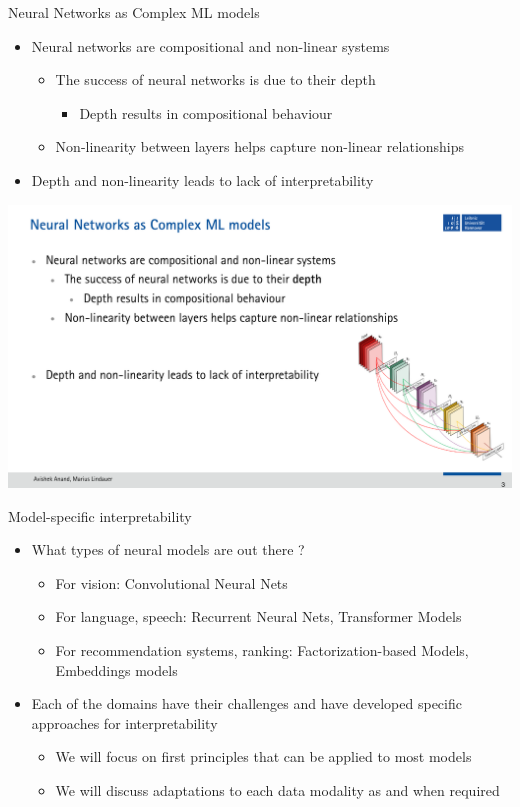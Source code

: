 \documentclass[11pt,compress,t,notes=noshow, aspectratio=169, xcolor=table]{beamer}
\begin{document}
\begin{frame}{Neural Networks as Complex ML models}
	\begin{itemize}
		\item Neural networks are compositional and non-linear systems
		\begin{itemize}
			\item The success of neural networks is due to their depth
			\begin{itemize}
				\item Depth results in compositional behaviour
			\end{itemize}
			\item Non-linearity between layers helps capture non-linear relationships
		\end{itemize}
		\bigskip
		
		\item Depth and non-linearity leads to lack of interpretability
	\end{itemize}

    \hfill
    \includegraphics[scale=.4]{img116}

\end{frame}

\begin{frame}[c]{Model-specific interpretability}
	\begin{itemize}
		\item What types of neural models are out there ?
		\begin{itemize}
			\item For vision: Convolutional Neural Nets
			\item For language, speech: Recurrent Neural Nets, Transformer Models
			\item For recommendation systems, ranking: Factorization-based Models, Embeddings
models
		\end{itemize}
		\item Each of the domains have their challenges and have developed specific approaches for
interpretability
		\begin{itemize}
			\item We will focus on first principles that can be applied to most models
			\item We will discuss adaptations to each data modality as and when required
		\end{itemize}
	\end{itemize}
	
\end{frame}
\end{document}
